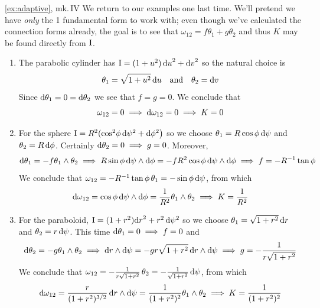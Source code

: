 

\begin{examples*}{\ref{ex:adaptive}, mk.\,IV}{}
We return to our examples one last time. We'll pretend we have \emph{only} the 1\st{} fundamental form to work with; even though we've calculated the connection forms already, the goal is to see that $\omega_{12}=f\theta_1+g\theta_2$ and thus $K$ may be found directly from $\mathrm{I}$.
\begin{enumerate}
  \item The parabolic cylinder has $\mathrm{I}=(1+u^2)\,{\mathrm{d} u}^2+{\mathrm{d} v}^2$ so the natural choice is
  \[\theta_1=\sqrt{1+u^2}\,{\mathrm{d} u}\quad\text{and}\quad \theta_2={\mathrm{d} v}\]
  Since $\mathrm{d}\theta_1=0=\mathrm{d}\theta_2$ we see that $f=g=0$.  We conclude that
  \[\omega_{12}=0\implies \mathrm{d}\omega_{12}=0\implies K=0\]
	
  \item For the sphere $\mathrm{I}=R^2(\cos^2\!\phi\,\mathrm{d}\psi^2+\mathrm{d}\phi^2\bigr)$ so we choose  $\theta_1=R\cos\phi\,\mathrm{d}\psi$ and $\theta_2=R\,\mathrm{d}\phi$. Certainly $\mathrm{d}\theta_2=0\implies g=0$. Moreover,
  \begin{gather*}
		\mathrm{d}\theta_1=-f\theta_1\wedge\theta_2\implies R\sin\phi\,\mathrm{d}\psi\wedge\mathrm{d}\phi=-fR^2\cos\phi\,\mathrm{d}\psi\wedge\mathrm{d}\phi\implies f=-R^{-1}\tan\phi
  \end{gather*}
  We conclude that $\omega_{12}=-R^{-1}\tan\phi\,\theta_1=-\sin\phi\,\mathrm{d}\psi$, from which
  \[\mathrm{d}\omega_{12}=\cos\phi\,\mathrm{d}\psi\wedge\mathrm{d}\phi=\frac 1{R^2}\theta_1\wedge\theta_2\implies K=\frac 1{R^2}\]
  
  \item For the paraboloid, $\mathrm{I}=(1+r^2){\mathrm{d} r}^2+r^2\,\mathrm{d}\psi^2$ so we choose $\theta_1=\sqrt{1+r^2}\,{\mathrm{d} r}$ and $\theta_2=r\,\mathrm{d}\psi$. This time $\mathrm{d}\theta_1=0\implies f=0$ and
  \begin{gather*}
		\mathrm{d}\theta_2=-g\theta_1\wedge\theta_2\implies {\mathrm{d}r}\wedge\mathrm{d}\psi=-gr\sqrt{1+r^2}\,{\mathrm{d} r}\wedge\mathrm{d}\psi\implies g=-\frac{1}{r\sqrt{1+r^2}}
  \end{gather*}
  We conclude that $\omega_{12}=-\frac{1}{r\sqrt{1+r^2}}\,\theta_2=-\frac{1}{\sqrt{1+r^2}}\,\mathrm{d}\psi$, from which
  \[\mathrm{d}\omega_{12}=\frac{r}{(1+r^2)^{3/2}}\,{\mathrm{d} r}\wedge\mathrm{d}\psi=\frac 1{(1+r^2)^2}\theta_1\wedge\theta_2\implies K=\frac 1{(1+r^2)^2}\]
\end{enumerate}
\end{examples*}


